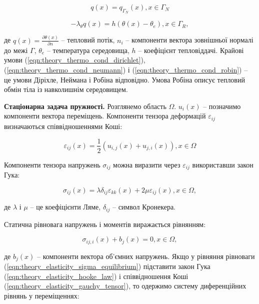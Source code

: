 \begin{equation}
    \label{eqn:theory_thermo_cond_neumann}
    q(x) = q_{\Gamma_N}(x), x \in \Gamma_N
\end{equation}

\begin{equation}
    \label{eqn:theory_thermo_cond_robin}
    -\lambda_\theta q(x) = h(\theta(x) - \theta_e), x \in \Gamma_R,
\end{equation}

\noindent де $q(x) = \frac{\partial \theta(x)}{\partial n}$ -- тепловий потік, $n_i$ -- компоненти вектора зовнішньої
нормалі до межі $\Gamma$, $\theta_e$ -- температура середовища, $h$ -- коефіцієнт тепловіддачі. Крайові умови
(\ref{eqn:theory_thermo_cond_dirichlet}), (\ref{eqn:theory_thermo_cond_neumann}) і (\ref{eqn:theory_thermo_cond_robin})
-- це умови Діріхле, Неймана і Робіна відповідно. Умова Робіна описує тепловий обмін тіла із навколишнім середовищем.

\textbf{Стаціонарна задача пружності.} Розглянемо область $\Omega$. $u_i(x)$ -- позначимо компоненти вектора переміщень. 
Компоненти тензора деформацій $\varepsilon_{ij}$ визначаються співвідношеннями Коші:  

\begin{equation}
    \label{eqn:theory_elasticity_gauchy_tensor}
    \varepsilon_{ij}(x) = \frac{1}{2}(u_{i,j}(x) + u_{j,i}(x)), x \in \Omega
\end{equation}

Компоненти тензора напружень $\sigma_{ij}$ можна виразити через $\varepsilon_{ij}$ використавши закон Гука:

\begin{equation}
    \label{eqn:theory_elasticity_hooke_law}
    \sigma_{ij}(x) = \lambda \delta_{ij}\varepsilon_{kk}(x) + 2\mu\varepsilon_{ij}(x), x \in \Omega,
\end{equation}

\noindent де $\lambda$ і $\mu$ -- це коефіцієнти Ляме, $\delta_{ij}$ -- символ Кронекера. 

Статична рівновага напружень і моментів виражається рівнянням:

\begin{equation}
    \label{eqn:theory_elasticity_sigma_equilibrium}
    \sigma_{ij,i}(x) + b_j(x) = 0, x \in \Omega,
\end{equation}

\noindent де $b_j(x)$ -- компоненти вектора об'ємних напружень. Якщо у рівняння рівноваги
(\ref{eqn:theory_elasticity_sigma_equilibrium}) підставити закон Гука (\ref{eqn:theory_elasticity_hooke_law}) і
співвідношення Коші (\ref{eqn:theory_elasticity_gauchy_tensor}), то одержимо систему диференційних рівнянь у
переміщеннях:

